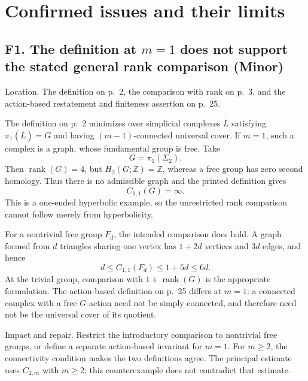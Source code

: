 \documentclass[10pt]{article}
\begin{document}
\section*{Confirmed issues and their limits}
\subsection*{F1. The definition at \(m=1\) does not support the stated general rank comparison (Minor)}
Location. The definition on p. 2, the comparison with rank on p. 3, and the action-based restatement and finiteness assertion on p. 25.\par
The definition on p. 2 minimizes over simplicial complexes \(\overline L\) satisfying \(\pi_1(\overline L)=G\) and having \((m-1)\)-connected universal cover. If \(m=1\), such a complex is a graph, whose fundamental group is free. Take \[G=\pi_1(\Sigma_2).\] Then \(\operatorname{rank}(G)=4\), but \(H_2(G;\mathbb Z)=\mathbb Z\), whereas a free group has zero second homology. Thus there is no admissible graph and the printed definition gives \[C_{1,1}(G)=\infty.\] This is a one-ended hyperbolic example, so the unrestricted rank comparison cannot follow merely from hyperbolicity.\par
For a nontrivial free group \(F_d\), the intended comparison does hold. A graph formed from \(d\) triangles sharing one vertex has \(1+2d\) vertices and \(3d\) edges, and hence \[d\le C_{1,1}(F_d)\le 1+5d\le 6d .\] At the trivial group, comparison with \(1+\operatorname{rank}(G)\) is the appropriate formulation. The action-based definition on p. 25 differs at \(m=1\): a connected complex with a free \(G\)-action need not be simply connected, and therefore need not be the universal cover of its quotient.\par
Impact and repair. Restrict the introductory comparison to nontrivial free groups, or define a separate action-based invariant for \(m=1\). For \(m\ge2\), the connectivity condition makes the two definitions agree. The principal estimate uses \(C_{2,m}\) with \(m\ge2\); this counterexample does not contradict that estimate.\par
\end{document}
